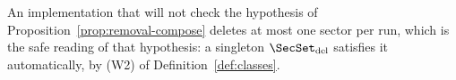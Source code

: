 
\begin{requirement}\label{req:single-sector-deletion}
An implementation that will not check the hypothesis of
Proposition~\ref{prop:removal-compose} deletes at most one sector per run,
which is the safe reading of that hypothesis: a singleton
$\SecSet_{\mathrm{del}}$ satisfies it automatically, by (W2) of
Definition~\ref{def:classes}.
\end{requirement}
